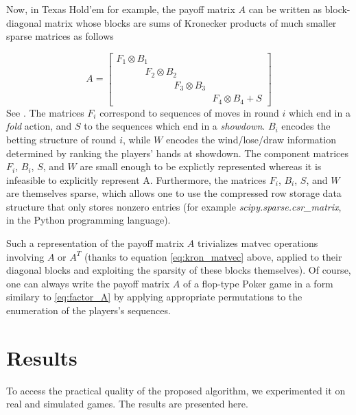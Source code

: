 \documentclass[12pt]{article}
\begin{document}
Now, in Texas Hold'em for example, the payoff matrix $A$ can be written as block-diagonal matrix whose blocks are sums of Kronecker products of much smaller sparse matrices as follows

\begin{equation}
  A = \begin{bmatrix}F_1 \otimes B_1\hspace{10em}\\\hspace{3em}F_2 \otimes B_2\hspace{7em}\\\hspace{6em}F_3 \otimes B_3\hspace{4em}\\\hspace{10em}F_4 \otimes B_4 + S \end{bmatrix}
\label{eq:factor_A}
\end{equation}
See \cite{hoda2010smoothing}. The matrices $F_i$ correspond to sequences of moves in round $i$ which end in a \textit{fold} action, and $S$ to the sequences which end in a \textit{showdown}. $B_i$ encodes the betting structure of round $i$, while $W$ encodes the wind/lose/draw information determined by ranking the players' hands at showdown. The component matrices $F_i$, $B_i$, $S$, and $W$ are small enough to be explictly represented whereas it is infeasible to explicitly represent A. Furthermore, the matrices $F_i$, $B_i$,
$S$, and $W$ are themselves sparse, which allows one to use the compressed row storage data structure that only stores nonzero entries (for example \textit{scipy.sparse.csr\_matrix}, in the Python programming language).

Such a representation of the payoff matrix $A$ trivializes matvec operations involving $A$ or $A^T$ (thanks to equation \eqref{eq:kron_matvec} above, applied to their diagonal blocks and exploiting the sparsity of these blocks themselves). Of course, one can always write the payoff matrix $A$ of a flop-type Poker game in a form similary to \eqref{eq:factor_A} by applying appropriate permutations to the enumeration of the players's sequences.

\section{Results}
\label{sec:results}
To access the practical quality of the proposed algorithm, we experimented it on real and simulated games. The results are presented here.
\end{document}
